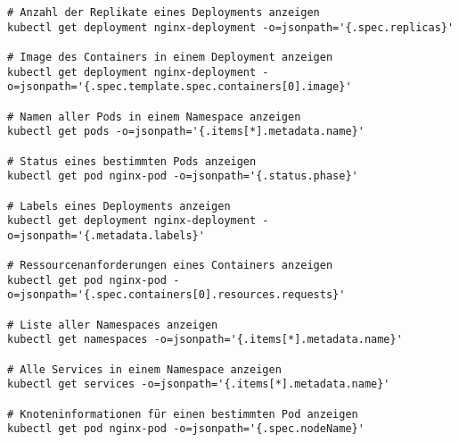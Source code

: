 \begin{verbatim}
# Anzahl der Replikate eines Deployments anzeigen
kubectl get deployment nginx-deployment -o=jsonpath='{.spec.replicas}'

# Image des Containers in einem Deployment anzeigen
kubectl get deployment nginx-deployment -o=jsonpath='{.spec.template.spec.containers[0].image}'

# Namen aller Pods in einem Namespace anzeigen
kubectl get pods -o=jsonpath='{.items[*].metadata.name}'

# Status eines bestimmten Pods anzeigen
kubectl get pod nginx-pod -o=jsonpath='{.status.phase}'

# Labels eines Deployments anzeigen
kubectl get deployment nginx-deployment -o=jsonpath='{.metadata.labels}'

# Ressourcenanforderungen eines Containers anzeigen
kubectl get pod nginx-pod -o=jsonpath='{.spec.containers[0].resources.requests}'

# Liste aller Namespaces anzeigen
kubectl get namespaces -o=jsonpath='{.items[*].metadata.name}'

# Alle Services in einem Namespace anzeigen
kubectl get services -o=jsonpath='{.items[*].metadata.name}'

# Knoteninformationen für einen bestimmten Pod anzeigen
kubectl get pod nginx-pod -o=jsonpath='{.spec.nodeName}'
\end{verbatim}
